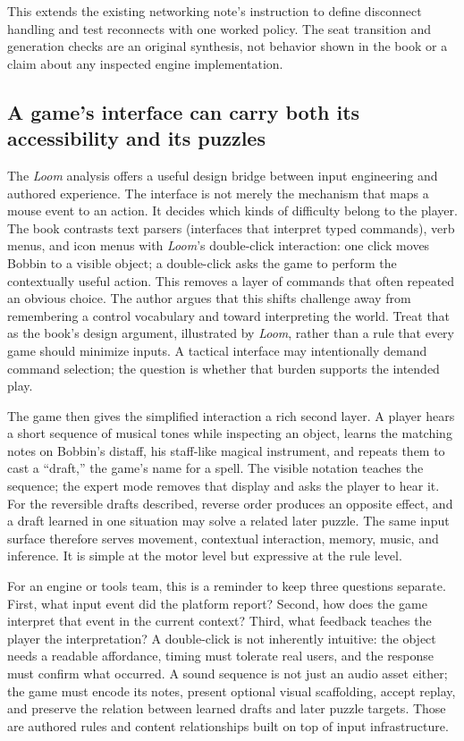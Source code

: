 This extends the existing networking note's instruction to define disconnect handling and test reconnects with one worked policy. The seat transition and generation checks are an original synthesis, not behavior shown in the book or a claim about any inspected engine implementation.

\subsection{A game's interface can carry both its accessibility and its puzzles}\label{a-games-interface-can-carry-both-its-accessibility-and-its-puzzles}

The \emph{Loom} analysis offers a useful design bridge between input engineering and authored experience. The interface is not merely the mechanism that maps a mouse event to an action. It decides which kinds of difficulty belong to the player. The book contrasts text parsers (interfaces that interpret typed commands), verb menus, and icon menus with \emph{Loom}'s double-click interaction: one click moves Bobbin to a visible object; a double-click asks the game to perform the contextually useful action. This removes a layer of commands that often repeated an obvious choice. The author argues that this shifts challenge away from remembering a control vocabulary and toward interpreting the world. Treat that as the book's design argument, illustrated by \emph{Loom}, rather than a rule that every game should minimize inputs. A tactical interface may intentionally demand command selection; the question is whether that burden supports the intended play.

The game then gives the simplified interaction a rich second layer. A player hears a short sequence of musical tones while inspecting an object, learns the matching notes on Bobbin's distaff, his staff-like magical instrument, and repeats them to cast a ``draft,'' the game's name for a spell. The visible notation teaches the sequence; the expert mode removes that display and asks the player to hear it. For the reversible drafts described, reverse order produces an opposite effect, and a draft learned in one situation may solve a related later puzzle. The same input surface therefore serves movement, contextual interaction, memory, music, and inference. It is simple at the motor level but expressive at the rule level.

For an engine or tools team, this is a reminder to keep three questions separate. First, what input event did the platform report? Second, how does the game interpret that event in the current context? Third, what feedback teaches the player the interpretation? A double-click is not inherently intuitive: the object needs a readable affordance, timing must tolerate real users, and the response must confirm what occurred. A sound sequence is not just an audio asset either; the game must encode its notes, present optional visual scaffolding, accept replay, and preserve the relation between learned drafts and later puzzle targets. Those are authored rules and content relationships built on top of input infrastructure.

